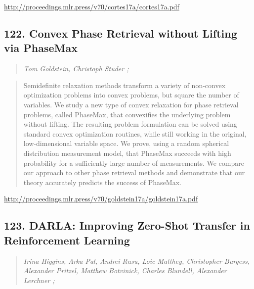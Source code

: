 \documentclass{article}
\begin{document}
\href{http://proceedings.mlr.press/v70/cortes17a/cortes17a.pdf}{http://proceedings.mlr.press/v70/cortes17a/cortes17a.pdf}

\subsection{122. Convex Phase Retrieval without Lifting via PhaseMax}

\begin{quote}
\footnotesize{\textit{Tom Goldstein, Christoph Studer ;}}

\end{quote}

\begin{quote}
    Semidefinite relaxation methods transform a variety of non-convex optimization problems into convex problems, but square the number of variables. We study a new type of convex relaxation for phase retrieval problems, called PhaseMax, that convexifies the underlying problem without lifting. The resulting problem formulation can be solved using standard convex optimization routines, while still working in the original, low-dimensional variable space. We prove, using a random spherical distribution measurement model, that PhaseMax succeeds with high probability for a sufficiently large number of measurements. We compare our approach to other phase retrieval methods and demonstrate that our theory accurately predicts the success of PhaseMax.  
\end{quote}

\href{http://proceedings.mlr.press/v70/goldstein17a/goldstein17a.pdf}{http://proceedings.mlr.press/v70/goldstein17a/goldstein17a.pdf}

\subsection{123. DARLA: Improving Zero-Shot Transfer in Reinforcement Learning}

\begin{quote}
\footnotesize{\textit{Irina Higgins, Arka Pal, Andrei Rusu, Loic Matthey, Christopher Burgess, Alexander Pritzel, Matthew Botvinick, Charles Blundell, Alexander Lerchner ;}}

\end{quote}
\end{document}
